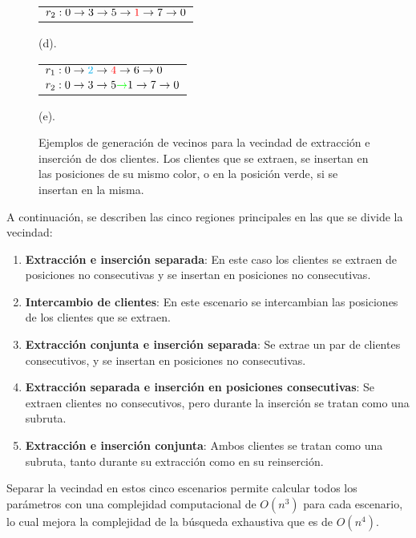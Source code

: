 \documentclass[12pt]{report}
\begin{document}
\begin{figure}[!h]
\begin{minipage}{0.45\textwidth}
\begin{tabular}{l}
				$r_2:0 \rightarrow 3 \rightarrow 5 \rightarrow \textcolor{red}{1} \rightarrow 7 \rightarrow 0$ \\
			\end{tabular}
			\caption*{(d).}
		\end{minipage}
		\begin{minipage}{0.45\textwidth}
			\centering
			\begin{tabular}{l}
				$r_1:0 \rightarrow \textcolor{cyan}{2} \rightarrow \textcolor{red}{4} \rightarrow 6 \rightarrow 0$ \\
				$r_2:0 \rightarrow 3 \rightarrow 5 \textcolor{green}{\rightarrow} 1 \rightarrow 7 \rightarrow 0$
			\end{tabular}
			\caption*{(e).}
		\end{minipage}
		\caption{Ejemplos de generación de vecinos para la vecindad de extracción e inserción de dos clientes. Los clientes que se extraen, se insertan en las posiciones de su mismo color, o en la posición verde, si se insertan en la misma.}
		\label{fig:generacion de vecinos}
	\end{figure}

	 A continuación, se describen las cinco regiones principales en las que se divide la vecindad:

	\begin{enumerate}
		\item \textbf{Extracción e inserción separada}: En este caso los clientes se extraen de posiciones no consecutivas y se insertan en posiciones no consecutivas.
		\item \textbf{Intercambio de clientes}: En este escenario se intercambian las posiciones de los clientes que se extraen.
		\item \textbf{Extracción conjunta e inserción separada}: Se extrae un par de clientes consecutivos, y se insertan en posiciones no consecutivas.
		\item \textbf{Extracción separada e inserción en posiciones consecutivas}: Se extraen clientes no consecutivos, pero durante la inserción se tratan como una subruta.
		\item \textbf{Extracción e inserción conjunta}: Ambos clientes se tratan como una subruta, tanto durante su extracción como en su reinserción.

              \end{enumerate}

	Separar la vecindad en estos cinco escenarios permite calcular todos los parámetros con una complejidad computacional de $O(n^3)$ para cada escenario, lo cual mejora la complejidad de la búsqueda exhaustiva que es de $O(n^4)$.
\end{document}

